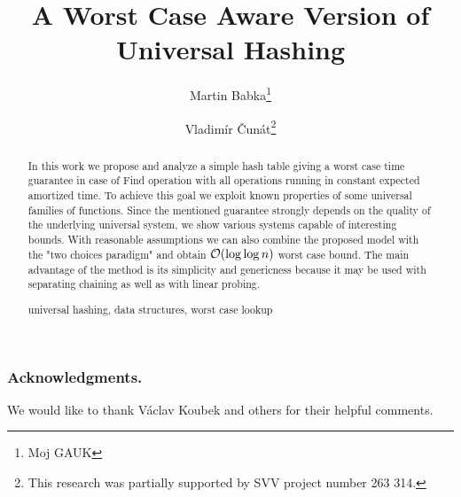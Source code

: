 \documentclass[runningheads,a4paper]{llncs}
\newcommand{\keywords}[1]{\par\addvspace\baselineskip
\noindent\keywordname\enspace\ignorespaces#1}
\begin{document}
\mainmatter

\author{Martin Babka\thanks{Moj GAUK} \and Vladimír Čunát\thanks{This research was partially supported by SVV project number 263 314.}}

\title{A Worst Case Aware Version of Universal Hashing}


\maketitle

\begin{abstract}
In this work we propose and analyze a simple hash table giving a worst case time guarantee in case of Find operation with all operations running in constant expected amortized time.
To achieve this goal we exploit known properties of some universal families of functions.
Since the mentioned guarantee strongly depends on the quality of the underlying universal system, we show various systems capable of interesting bounds.
With reasonable assumptions we can also combine the proposed model with the "two choices paradigm" and obtain $\mathcal{O}(\log \log n)$ worst case bound.
The main advantage of the method is its simplicity and genericness because it may be used with separating chaining as well as with linear probing.

\keywords{universal hashing, data structures, worst case lookup}
\end{abstract}






\subsubsection*{Acknowledgments.}
We would like to thank Václav Koubek and others for their helpful comments.



\clearpage
% 


\end{document}
